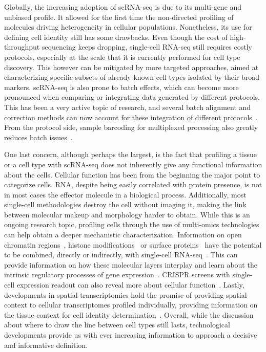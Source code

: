 Globally, the increasing adoption of scRNA-seq is due to its multi-gene and unbiased profile. It allowed for the first time the non-directed profiling of molecules driving heterogeneity in cellular populations. Nonetheless, its use for defining cell identity still has some drawbacks. Even though the cost of high-throughput sequencing keeps dropping, single-cell RNA-seq still requires costly protocols, especially at the scale that it is currently performed for cell type discovery. This however can be mitigated by more targeted approaches, aimed at characterizing specific subsets of already known cell types isolated by their broad markers. scRNA-seq is also prone to batch effects, which can become more pronounced when comparing or integrating data generated by different protocols. This has been a very active topic of research, and several batch alignment and correction methods can now account for these integration of different protocols~\citep{butler_integrating_2018,haghverdi_batch_2018,park_fast_2018,stuart_comprehensive_2019}. From the protocol side, sample barcoding for multiplexed processing also greatly reduces batch issues~\citep{stoeckius_cell_2018,shin_multiplexed_2019}.

One last concern, although perhaps the largest, is the fact that profiling a tissue or a cell type with scRNA-seq does not inherently give any functional information about the cells. Cellular function has been from the beginning the major point to categorize cells. RNA, despite being easily correlated with protein presence, is not in most cases the effector molecule in a biological process. Additionally, most single-cell methodologies destroy the cell without imaging it, making the link between molecular makeup and morphology harder to obtain. While this is an ongoing research topic, profiling cells through the use of multi-omics technologies can help obtain a deeper mechanistic characterization. Information on open chromatin regions~\citep{buenrostro_single-cell_2015}, histone modifications~\citep{kaya-okur_cut&tag_2019} or surface proteins~\citep{stoeckius_simultaneous_2017} have the potential to be combined, directly or indirectly, with single-cell RNA-seq~\citep{clark_scnmt-seq_2018}. This can provide information on how these molecular layers interplay and learn about the intrinsic regulatory processes of gene expression~\citep{gorin_rna_2019,qiu_mapping_2019}. CRISPR screens with single-cell expression readout can also reveal more about cellular function~\citep{dixit_perturb-seq:_2016,datlinger_pooled_2017}. Lastly, developments in spatial transcriptomics hold the promise of providing spatial context to cellular transcriptomes profiled individually, providing information on the tissue context for cell identity determination~\citep{vickovic_high-density_2019,rodriques_slide-seq:_2019}. Overall, while the discussion about where to draw the line between cell types still lasts, technological developments provide us with ever increasing information to approach a decisive and informative definition.



